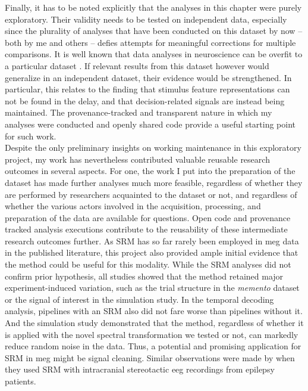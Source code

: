 Finally, it has to be noted explicitly that the analyses in this chapter were purely exploratory.
Their validity needs to be tested on independent data, especially since the plurality of analyses that have been conducted on this dataset by now -- both by me and others -- defies attempts for meaningful corrections for multiple comparisons.
It is well known that data analyses in neuroscience can be overfit to a particular dataset \citep{hosseini2020tried}.
If relevant results from this dataset however would generalize in an independent dataset, their evidence would be strengthened.
In particular, this relates to the finding that stimulus feature representations can not be found in the delay, and that  decision-related signals are instead being maintained.
The provenance-tracked and transparent nature in which my analyses were conducted and openly shared code provide a useful starting point for such work.\\
Despite the only preliminary insights on working maintenance in this exploratory project, my work has nevertheless contributed valuable reusable research outcomes in several aspects.
For one, the work I put into the preparation of the dataset has made further analyses much more feasible, regardless of whether they are performed by researchers acquainted to the dataset or not, and regardless of whether the various actors involved in the acquisition, processing, and preparation of the data are available for questions.
Open code and provenance tracked analysis executions contribute to the reusability of these intermediate research outcomes further.
As \gls{SRM} has so far rarely been employed in \gls{meg} data in the published literature, this project also provided ample initial evidence that the method could be useful for this modality.
While the \gls{SRM} analyses did not confirm prior hypothesis, all studies showed that the method retained major experiment-induced variation, such as the trial structure in the \textit{memento} dataset or the signal of interest in the simulation study.
In the temporal decoding analysis, pipelines with an \gls{SRM} also did not fare worse than pipelines without it.
And the simulation study demonstrated that the method, regardless of whether it is applied with the novel spectral transformation we tested or not, can markedly reduce random noise in the data.
Thus, a potential and promising application for \gls{SRM} in \gls{meg} might be signal cleaning.
Similar observations were made by \citet{xie2021minimal} when they used \gls{SRM} with intracranial stereotactic \gls{eeg} recordings from epilepsy patients.\\
